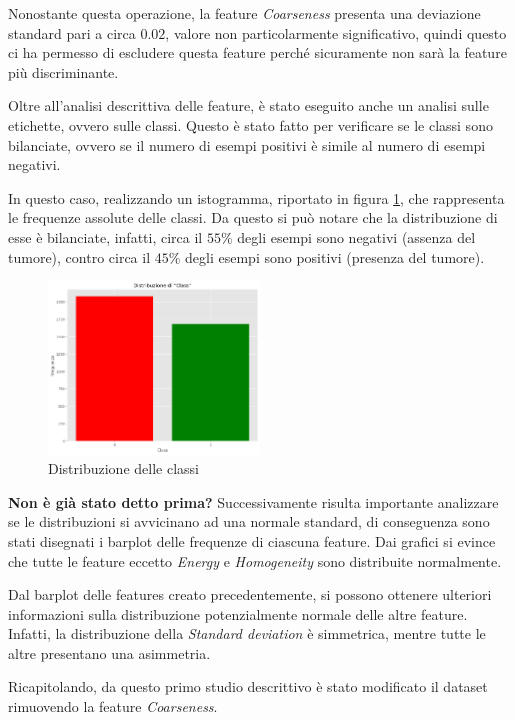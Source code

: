 Nonostante questa operazione, la feature \textit{Coarseness} presenta una deviazione
standard pari a circa $0.02$, valore non particolarmente significativo, quindi
questo ci ha permesso di escludere questa feature perché sicuramente non sarà la
feature più discriminante.

Oltre all'analisi descrittiva delle feature, è stato eseguito anche un analisi
sulle etichette, ovvero sulle classi. Questo è stato fatto per verificare se le
classi sono bilanciate, ovvero se il numero di esempi positivi è simile al numero
di esempi negativi.

In questo caso, realizzando un istogramma, riportato in figura \ref{fig:dist-classi},
che rappresenta le frequenze assolute delle classi. Da questo si può notare che
la distribuzione di esse è bilanciate, infatti, circa il $55\%$ degli esempi sono
negativi (assenza del tumore), contro circa il $45\%$ degli esempi sono positivi
(presenza del tumore).

\begin{figure}[!ht]
      \centering
      \includegraphics[width=0.5\textwidth]{img/analisi/distribuzioneClassi.png}
      \caption{Distribuzione delle classi}
      \label{fig:dist-classi}
\end{figure}

\textbf{Non è già stato detto prima?}
Successivamente risulta importante analizzare se le distribuzioni si avvicinano
ad una normale standard, di conseguenza sono stati disegnati i barplot delle frequenze
di ciascuna feature. Dai grafici si evince che tutte le feature eccetto \textit{Energy} e
\textit{Homogeneity} sono distribuite normalmente.

Dal barplot delle features creato precedentemente, si possono ottenere ulteriori
informazioni sulla distribuzione potenzialmente normale delle altre feature. Infatti,
la distribuzione della \textit{Standard deviation} è simmetrica, mentre tutte
le altre presentano una asimmetria.

Ricapitolando, da questo primo studio descrittivo è stato modificato il dataset
rimuovendo la feature \textit{Coarseness}.

